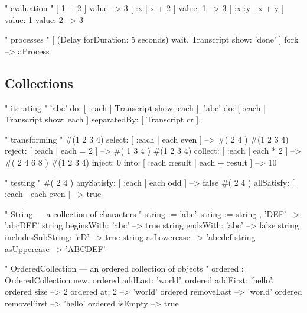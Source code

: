 \documentclass[8pt,a4paper]{leaflet}
\begin{document}
\begin{code}
" evaluation "
[ 1 + 2 ] value --> 3
[ :x | x + 2 ] value: 1 --> 3
[ :x :y | x + y ] value: 1 value: 2 --> 3
	
" processes "
[ (Delay forDuration: 5 seconds) wait.
  Transcript show: 'done' ] fork --> aProcess
\end{code}

\subsection{Collections}

\begin{code}
" iterating "
'abc' do: [ :each | Transcript show: each ].
'abc'
	do: [ :each | Transcript show: each ]
	separatedBy: [ Transcript cr ].
\end{code}

\begin{code}
" transforming "
#(1 2 3 4) select: [ :each | each even ] --> #( 2 4 )
#(1 2 3 4) reject: [ :each | each = 2 ] --> #( 1 3 4 )
#(1 2 3 4) collect: [ :each | each * 2 ] --> #( 2 4 6 8 )
#(1 2 3 4) 
	inject: 0 
	into: [ :each :result | each + result ] --> 10
\end{code}

\begin{code}
" testing "
#( 2 4 ) anySatisfy: [ :each | each odd ] --> false
#( 2 4 ) allSatisfy: [ :each | each even ] --> true
\end{code}


\begin{code}
" String --- a collection of characters "
string := 'abc'.
string := string , 'DEF' --> 'abcDEF'
string beginsWith: 'abc' --> true
string endsWith: 'abc' --> false
string includesSubString: 'cD' --> true
string asLowercase --> 'abcdef
string asUppercase --> 'ABCDEF'
\end{code}

\begin{code}
" OrderedCollection --- an ordered collection of objects "
ordered := OrderedCollection new.
ordered addLast: 'world'.
ordered addFirst: 'hello'.
ordered size --> 2
ordered at: 2 --> 'world'
ordered removeLast --> 'world'
ordered removeFirst --> 'hello'
ordered isEmpty --> true
\end{code}
\end{document}
